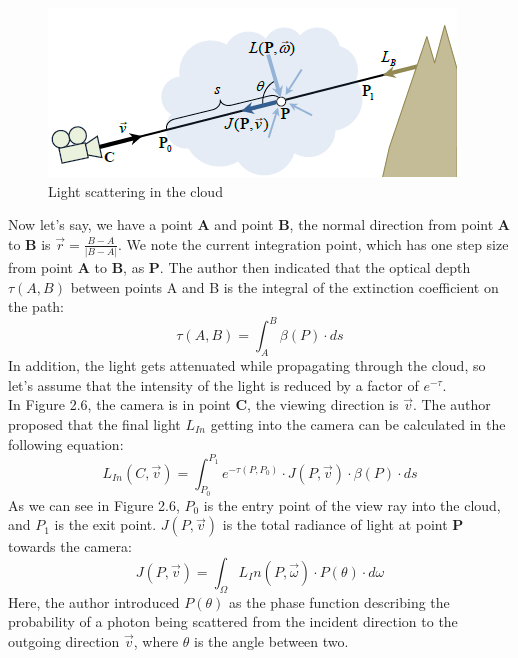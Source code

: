 \begin{figure}[htp]
\begin{center}
\includegraphics[scale=1.0]{images/scatteringscene.png}
\caption{Light scattering in the cloud}
\label{f6}
\end{center}
\end{figure}

Now let's say, we have a point \textbf{A} and point \textbf{B}, the normal direction from point \textbf{A} to \textbf{B} is $\vec{r} = \frac{B-A}{|B-A|}$. We note the current integration point, which has one step size from point \textbf{A} to \textbf{B}, as \textbf{P}.
The author then indicated that the optical depth $\tau(A, B)$ between points A and B is the integral of the extinction coefficient on the path:
\begin{equation}
\tau(A, B) = \int_{A}^{B}\beta(P)\cdot ds
\end{equation}
In addition, the light gets attenuated while propagating through the cloud, so let's assume that the intensity of the light is reduced by a factor of $e^{-\tau}$.\\
In Figure 2.6, the camera is in point \textbf{C}, the viewing direction is $\vec{v}$. The author proposed that the final light $L_{In}$ getting into the camera can be calculated in the following equation:
\begin{equation}
L_{In}(C, \vec{v}) = \int_{P_0}^{P_1}e^{-\tau(P, P_0)} \cdot J(P, \vec{v}) \cdot \beta(P) \cdot ds
\end{equation}
As we can see in Figure 2.6, $P_0$ is the entry point of the view ray into the cloud, and $P_1$ is the exit point. $J(P, \vec{v})$ is the total radiance of light at point \textbf{P} towards the camera:
\begin{equation}
J(P, \vec{v}) = \int_{\Omega}L_In(P, \vec{\omega}) \cdot P(\theta) \cdot d\omega
\end{equation}
Here, the author introduced $P(\theta)$ as the phase function describing the probability of a photon being scattered from the incident direction to the outgoing direction $\vec{v}$, where $\theta$ is the angle between two.
